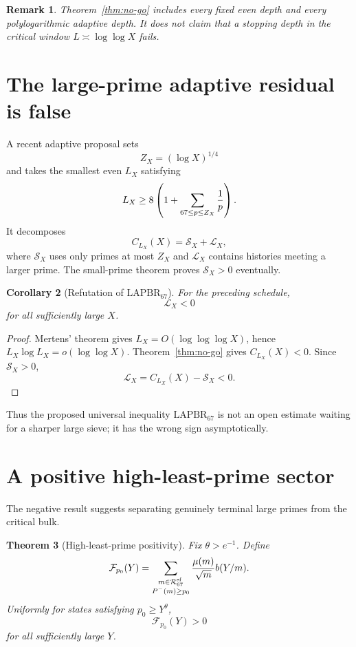 \documentclass[11pt]{article}
\newtheorem{theorem}{Theorem}[section]
\newtheorem{corollary}[theorem]{Corollary}
\newtheorem{remark}[theorem]{Remark}
\newcommand{\Rcal}{\mathcal R}
\newcommand{\Fcal}{\mathcal F}
\newcommand{\Scal}{\mathcal S}
\newcommand{\Lcal}{\mathcal L}
\newcommand{\LAPBR}{\mathrm{LAPBR}_{67}}
\begin{document}
\begin{remark}
Theorem~\ref{thm:no-go} includes every fixed even depth and every polylogarithmic
adaptive depth.  It does not claim that a stopping depth in the critical window
$L\asymp\log\log X$ fails.
\end{remark}

\section{The large-prime adaptive residual is false}

A recent adaptive proposal sets
\[
 Z_X=(\log X)^{1/4}
\]
and takes the smallest even $L_X$ satisfying
\[
 L_X\ge8\left(1+\sum_{67\le p\le Z_X}{1\over p}\right).
\]
It decomposes
\[
 C_{L_X}(X)=\Scal_X+\Lcal_X,
\]
where $\Scal_X$ uses only primes at most $Z_X$ and $\Lcal_X$ contains histories
meeting a larger prime.  The small-prime theorem proves $\Scal_X>0$ eventually.

\begin{corollary}[Refutation of $\LAPBR$]\label{cor:lapbr}
For the preceding schedule,
\[
 \boxed{\Lcal_X<0}
\]
for all sufficiently large $X$.
\end{corollary}

\begin{proof}
Mertens' theorem gives $L_X=O(\log\log\log X)$, hence
$L_X\log L_X=o(\log\log X)$.  Theorem~\ref{thm:no-go} gives
$C_{L_X}(X)<0$.  Since $\Scal_X>0$,
\[
 \Lcal_X=C_{L_X}(X)-\Scal_X<0.
\]
\end{proof}

Thus the proposed universal inequality $\LAPBR$ is not an open estimate waiting
for a sharper large sieve; it has the wrong sign asymptotically.

\section{A positive high-least-prime sector}

The negative result suggests separating genuinely terminal large primes from
the critical bulk.

\begin{theorem}[High-least-prime positivity]\label{thm:high-prime}
Fix $\theta>e^{-1}$.  Define
\[
 \Fcal_{p_0}(Y)=
 \sum_{\substack{m\in\Rcal_{67}^{\mathrm{sf}}\\P^-(m)\ge p_0}}
 {\mu(m)\over\sqrt m}b(Y/m).
\]
Uniformly for states satisfying $p_0\ge Y^\theta$,
\[
 \boxed{\Fcal_{p_0}(Y)>0}
\]
for all sufficiently large $Y$.
\end{theorem}
\end{document}
